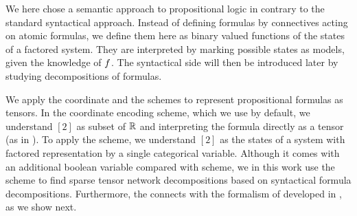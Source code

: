 

We here chose a semantic approach to propositional logic in contrary to the standard syntactical approach.
Instead of defining formulas by connectives acting on atomic formulas, we define them here as binary valued functions of the states of a factored system.
They are interpreted by marking possible states as models, given the knowledge of $f$.
The syntactical side will then be introduced later by studying decompositions of formulas.


%	




We apply the coordinate and the \basisEncoding{} schemes to represent propositional formulas as tensors.
In the coordinate encoding scheme, which we use by default, we understand $[2]$ as subset of $\mathbb{R}$ and interpreting the formula directly as a tensor (as in ).
To apply the \basisEncoding{} scheme, we understand $[2]$ as the states of a system with factored representation by a single categorical variable.
Although it comes with an additional boolean variable compared with \coordinateEncoding{} scheme, we in this work use the \basisEncoding{} scheme to find sparse tensor network decompositions based on syntactical formula decompositions.
Furthermore, the \basisEncoding{} connects with the formalism of \ComputationActivationNetworks{} developed in , as we show next.

